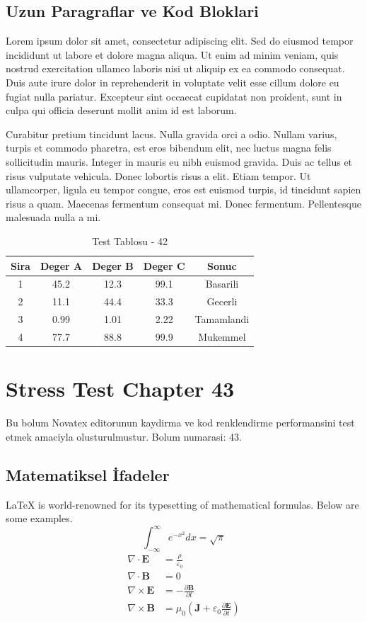 \documentclass[12pt,a4paper]{article}
\begin{document}
\subsection{Uzun Paragraflar ve Kod Bloklari}
Lorem ipsum dolor sit amet, consectetur adipiscing elit. Sed do eiusmod tempor incididunt ut labore et dolore magna aliqua. Ut enim ad minim veniam, quis nostrud exercitation ullamco laboris nisi ut aliquip ex ea commodo consequat. Duis aute irure dolor in reprehenderit in voluptate velit esse cillum dolore eu fugiat nulla pariatur. Excepteur sint occaecat cupidatat non proident, sunt in culpa qui officia deserunt mollit anim id est laborum.

Curabitur pretium tincidunt lacus. Nulla gravida orci a odio. Nullam varius, turpis et commodo pharetra, est eros bibendum elit, nec luctus magna felis sollicitudin mauris. Integer in mauris eu nibh euismod gravida. Duis ac tellus et risus vulputate vehicula. Donec lobortis risus a elit. Etiam tempor. Ut ullamcorper, ligula eu tempor congue, eros est euismod turpis, id tincidunt sapien risus a quam. Maecenas fermentum consequat mi. Donec fermentum. Pellentesque malesuada nulla a mi.

\begin{table}[h!]
\centering
\begin{tabular}{|c|c|c|c|c|}
\hline
\textbf{Sira} & \textbf{Deger A} & \textbf{Deger B} & \textbf{Deger C} & \textbf{Sonuc} \\
\hline
1 & 45.2 & 12.3 & 99.1 & Basarili \\
2 & 11.1 & 44.4 & 33.3 & Gecerli \\
3 & 0.99 & 1.01 & 2.22 & Tamamlandi \\
4 & 77.7 & 88.8 & 99.9 & Mukemmel \\
\hline
\end{tabular}
\caption{Test Tablosu - 42}
\end{table}

\newpage
\section{Stress Test Chapter 43}
Bu bolum Novatex editorunun kaydirma ve kod renklendirme performansini test etmek amaciyla olusturulmustur. Bolum numarasi: 43.

\subsection{Matematiksel İfadeler}
\LaTeX{} is world-renowned for its typesetting of mathematical formulas. Below are some examples.
\begin{equation}
\int_{-\infty}^{\infty} e^{-x^2} dx = \sqrt{\pi}
\end{equation}
\begin{align}
\nabla \cdot \mathbf{E} &= \frac{\rho}{\varepsilon_0} \\
\nabla \cdot \mathbf{B} &= 0 \\
\nabla \times \mathbf{E} &= -\frac{\partial \mathbf{B}}{\partial t} \\
\nabla \times \mathbf{B} &= \mu_0\left(\mathbf{J} + \varepsilon_0 \frac{\partial \mathbf{E}}{\partial t}\right)
\end{align}
\end{document}
